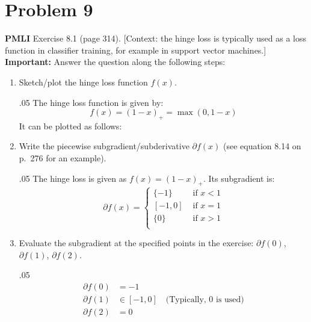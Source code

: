 \documentclass[11pt,twoside]{article}
\newcommand{\pts}[1]{\marginpar{ \small\hspace{0pt} \textit{[#1]} } }
\newcommand{\?}{\stackrel{?}{=}}
\newcommand{\bl}{\color{blue}}
\newenvironment{solution}{\begin{adjustwidth}{.05\textwidth}{}\bl}{\medskip\end{adjustwidth}}
\begin{document}
 \section*{Problem 9 }
\textbf{PMLI} Exercise 8.1 (page 314). [Context: the hinge loss is typically used as a loss function in classifier training, for example in support vector machines.]
\textbf{Important:} Answer the question along the following steps:
\begin{enumerate}[\bf (a)]
\item Sketch/plot the hinge loss function $f(x)$.\pts{2}
  
\begin{solution}
  The hinge loss function is given by:
  \begin{equation*}
    f(x) = (1 - x)_{+} = \max(0, 1 - x)
  \end{equation*}
  It can be plotted as follows:
  \begin{center}
  \end{center}
\end{solution}

\item Write the piecewise subgradient/subderivative \pts{2} $\partial f(x)$ (see equation 8.14 on p.\ 276 for an example).
  \begin{solution}
   The hinge loss is given as $f(x) = (1-x)_{+}$. Its subgradient is:
    \begin{equation*}
      \partial f(x) =
      \begin{cases}
        \{-1\} & \text{ if } x < 1 \\
        [-1,0]      & \text{ if } x = 1  \\
        \{0\} & \text{ if } x > 1 \\
      \end{cases}
    \end{equation*}
  \end{solution}
\item Evaluate the subgradient at the specified \pts{3} points in the exercise: $\partial f(0)$, $\partial f(1)$, $\partial f(2)$.
  \begin{solution}
    \begin{align*}
      \partial f(0) &= -1 \\
      \partial f(1) &\in [-1,0] \quad \text{(Typically, 0 is used)}\\
      \partial f(2) &= 0
    \end{align*}
  \end{solution}
\end{enumerate}
\end{document}
